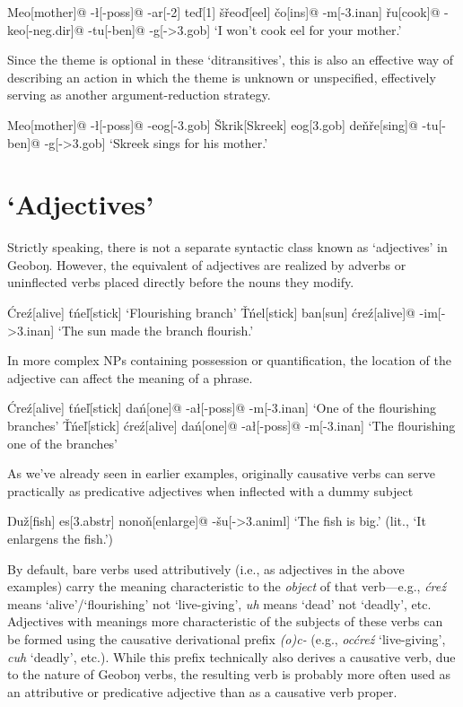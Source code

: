 \documentclass[a4paper,11pt,oneside,openany]{memoir}
\newcommand{\vt}{ť}
\newcommand{\vd}{ď}
\newcommand{\vc}{č}
\newcommand{\vz}{ž}
\newcommand{\vs}{š}
\newcommand{\vr}{ř}
\newcommand{\vl}{ľ}
\newcommand{\vn}{ň}
\newcommand{\vT}{Ť}
\newcommand{\vS}{Š}
\newcommand{\Engma}{Ŋ}
\newcommand{\engma}{ŋ}
\begin{document}
\ex
\begingl
Meo[mother]@
-\l[-{\sc poss}]@
-ar[-2]
te{\vd}[1]
\vs\vr eo{\vd}[eel]
\vc o[{\sc ins}]@
-m[-{\sc 3.inan}] 
\vr u[cook]@
-keo[-{\sc neg.dir}]@
-tu[-{\sc ben}]@
-g[-{\sc >3.gob}]
\glft `I won't cook eel for your mother.'
\endgl
\xe

Since the theme is optional in these `ditransitives', this is also an effective way of describing an action in which the theme is unknown or unspecified, effectively serving as another argument-reduction strategy.

\ex
\begingl
Meo[mother]@
-\l[-{\sc poss}]@
-eog[-{\sc 3.gob}]
\vS krik[Skreek]
eog[{\sc 3.gob}]
de\vn\vr e[sing]@
-tu[-{\sc ben}]@
-g[-{\sc >3.gob}]
\glft `Skreek sings for his mother.'
\endgl
\xe

\section{`Adjectives'}

Strictly speaking, there is not a separate syntactic class known as `adjectives' in Geobo{\engma}. However, the equivalent of adjectives are realized by adverbs or uninflected verbs placed directly before the nouns they modify.

\pex
\a
\begingl
\'Cre\'z[alive]
\vt\'ne\vl[stick]
\glft  `Flourishing branch'
\endgl
\a 
\begingl
\vT\'nel[stick]
ban[sun]
\'cre\'z[alive]@
-im[\sc ->3.inan]
\glft `The sun made the branch flourish.'
\endgl
\xe

In more complex NPs containing possession or quantification, the location of the adjective can affect the meaning of a phrase.

\pex
\a
\begingl
\'Cre\'z[alive]
\vt\'ne{\vl}[stick]
da\'n[one]@
-a\l[-{\sc poss}]@
-m[-{\sc 3.inan}]
\glft  `One of the flourishing branches'
\endgl
\a
\begingl
\vT\'ne{\vl}[stick]
\'cre\'z[alive]
da\'n[one]@
-a\l[-{\sc poss}]@
-m[-{\sc 3.inan}]
\glft  `The flourishing one of the branches'
\endgl
\xe

As we've already seen in earlier examples, originally causative verbs can serve practically as predicative adjectives when inflected with a dummy subject

\ex
\begingl
\Engma u\vz[fish]
es[\sc 3.abstr]
nono\vn[enlarge]@
-\vs u[\sc ->3.animl]
\glft `The fish is big.' (lit., `It enlargens the fish.')
\endgl
\xe

By default, bare verbs used attributively (i.e., as adjectives in the above examples) carry the meaning characteristic to the \textit{object} of that verb---e.g., \textit{\'cre\'z} means `alive'/`flourishing' not `live-giving', \textit{uh} means `dead' not `deadly', etc. Adjectives with meanings more characteristic of the subjects of these verbs can be formed using the causative derivational prefix \textit{(o)c-} (e.g., \textit{oc\'cre\'z} `live-giving', \textit{cuh} `deadly', etc.). While this prefix technically also derives a causative verb, due to the nature of Geobo{\engma} verbs, the resulting verb is probably more often used as an attributive or predicative adjective than as a causative verb proper. 
\end{document}
